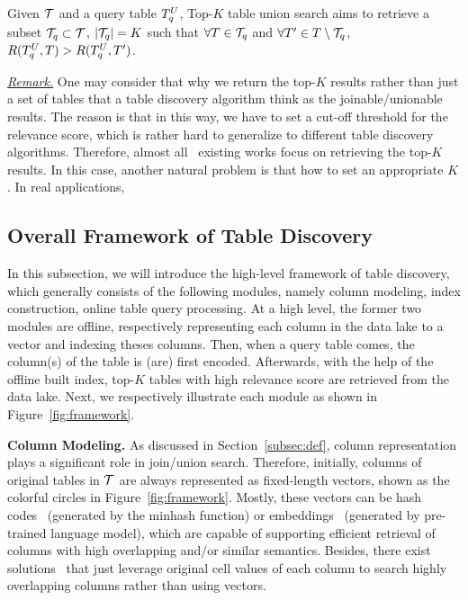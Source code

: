 \begin{definition}
	Given $\mathcal{T}$ and a query table $T^U_q$, Top-$K$ table union search aims to retrieve a subset $\mathcal{T}_q \subset \mathcal{T}$, $|\mathcal{T}_q|=K$ such that $\forall T \in \mathcal{T}_q$ and $\forall T' \in T \setminus \mathcal{T}_q$, $R(T^U_q, T)>R(T^U_q, T')$.
\end{definition}


\noindent \underline{\textit{Remark.}} One may consider that why we return the top-$K$ results rather than just  a set of  tables that a table discovery algorithm think as the joinable/unionable results.
The reason is that in this way, we have to set a cut-off threshold for the relevance score, which is rather hard to generalize to different table discovery algorithms. Therefore, almost all~\cite{} existing works focus on retrieving the top-$K$ results.  In this case, another natural problem is that how to set an appropriate $K$. In real applications, 

\subsection{Overall Framework of Table Discovery}

In this subsection, we will introduce the high-level framework of table discovery, which generally consists of the following modules, namely column modeling, index construction, online table query processing.
At a high level, the former two modules are offline, \ie respectively representing each column in the data lake to a vector and indexing theses columns. Then, when a query table comes, the column(s) of the table is (are) first encoded. Afterwards, with the help of the offline built index, top-$K$ tables with high relevance score are retrieved from the data lake. Next, we respectively illustrate each module as shown in Figure~\ref{fig:framework}.



\noindent\textbf{Column Modeling.}
As discussed in Section~\ref{subsec:def},  column representation plays a significant role in join/union search. Therefore,  initially,  columns of  original tables in $\mathcal{T}$ are always represented as fixed-length vectors, shown as the colorful circles in Figure~\ref{fig:framework}.
Mostly,  these vectors can be hash codes~\cite{} (\eg generated by the minhash function) or embeddings~\cite{} (\eg generated by pre-trained language model), which are capable of supporting efficient retrieval of columns with high overlapping and/or similar semantics. Besides, there exist solutions~\cite{} that just leverage original cell values of each column to search highly overlapping columns rather than using vectors. 

